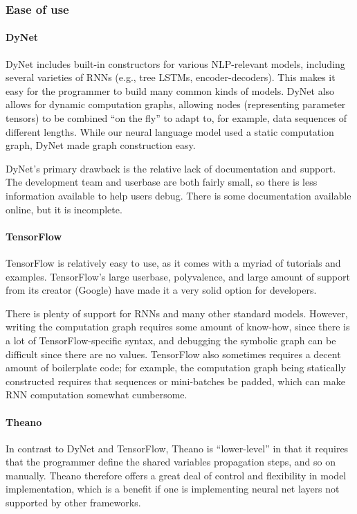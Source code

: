 \documentclass{article}
\begin{document}
\subsubsection{Ease of use}

\paragraph{DyNet}
DyNet includes built-in constructors for various NLP-relevant models, including several varieties of RNNs (e.g., tree LSTMs, encoder-decoders). This makes it easy for the programmer to build many common kinds of models. DyNet also allows for dynamic computation graphs, allowing nodes (representing parameter tensors) to be combined ``on the fly'' to adapt to, for example, data sequences of different lengths. While our neural language model used a static computation graph, DyNet made graph construction easy.

DyNet's primary drawback is the relative lack of documentation and support. The development team and userbase are both fairly small, so there is less information available to help users debug. There is some documentation available online, but it is incomplete.

\paragraph{TensorFlow} TensorFlow is relatively easy to use, as it comes with a myriad of tutorials and examples. TensorFlow's large userbase, polyvalence, and large amount of support from its creator (Google) have made it a very solid option for developers.

There is plenty of support for RNNs and many other standard models. However, writing the computation graph requires some amount of know-how, since there is a lot of TensorFlow-specific syntax, and debugging the symbolic graph can be difficult since there are no values. TensorFlow also sometimes requires a decent amount of boilerplate code; for example, the computation graph being statically constructed requires that sequences or mini-batches be padded, which can make RNN computation somewhat cumbersome.

\paragraph{Theano}
In contrast to DyNet and TensorFlow, Theano is ``lower-level'' in that it requires that the programmer define the shared variables propagation steps, and so on manually. Theano therefore offers a great deal of control and flexibility in model implementation, which is a benefit if one is implementing neural net layers not supported by other frameworks.
\end{document}
